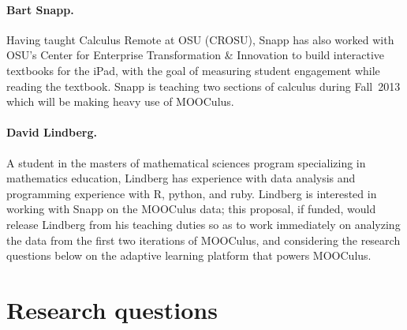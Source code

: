 \documentclass[12pt]{article}
\begin{document}
\paragraph*{Bart Snapp.} Having taught Calculus Remote at OSU (CROSU),
Snapp has also worked with OSU's Center for Enterprise Transformation
\& Innovation to build interactive textbooks for the iPad, with the
goal of measuring student engagement while reading the textbook.
Snapp is teaching two sections of calculus during Fall~2013 which will
be making heavy use of MOOCulus.

\paragraph*{David Lindberg.} A student in the masters of mathematical
sciences program specializing in mathematics education, Lindberg has
experience with data analysis and programming experience with R,
python, and ruby.  Lindberg is interested in working with Snapp on the
MOOCulus data; this proposal, if funded, would release Lindberg from
his teaching duties so as to work immediately on analyzing the data
from the first two iterations of MOOCulus, and considering the
research questions below on the adaptive learning platform that powers
MOOCulus.

\section{Research questions}
\end{document}
